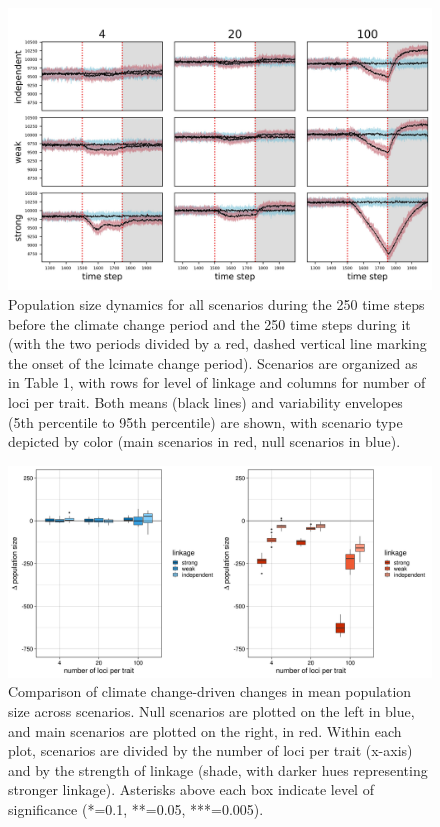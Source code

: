 \documentclass[9pt,twocolumn,twoside,lineno]{pnas-new}
\begin{document}
\begin{figure}
\centering
\includegraphics[width=11.4cm]{Nt_over_time.jpg}
\caption{Population size dynamics for all scenarios during the 250 time steps before the climate change period and the 250 time steps during it (with the two periods divided by a red, dashed vertical line marking the onset of the lcimate change period). Scenarios are organized as in Table 1, with rows for level of linkage and columns for number of loci per trait. Both means (black lines) and variability envelopes (5th percentile to 95th percentile) are shown, with scenario type depicted by color (main scenarios in red, null scenarios in blue).}
\label{fig:Nt_over_time}
\end{figure}

\begin{figure}
\centering
\includegraphics[width=11.4cm]{Nt_boxplot.jpg}
\caption{Comparison of climate change-driven changes in mean population size across scenarios. Null scenarios are plotted on the left in blue, and main scenarios are plotted on the right, in red. Within each plot, scenarios are divided by the number of loci per trait (x-axis) and by the strength of linkage (shade, with darker hues representing stronger linkage). Asterisks above each box indicate level of significance (*=0.1, **=0.05, ***=0.005).}
\label{fig:Nt_boxplot}
\end{figure}
\end{document}
